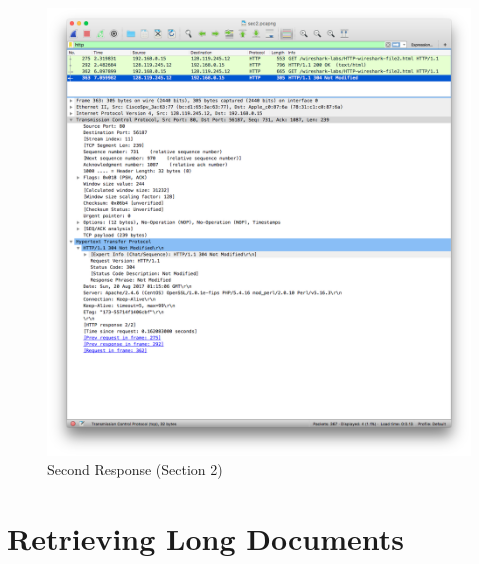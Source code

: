 \documentclass[11pt]{article}
\begin{document}
\begin{itemize}
		\begin{figure}[H]
		\centering
		\caption{Second Response (Section 2)}
		\includegraphics[width=\textwidth]{02-response_2}
		\end{figure}

\end{itemize}

\section{Retrieving Long Documents}
\end{document}
